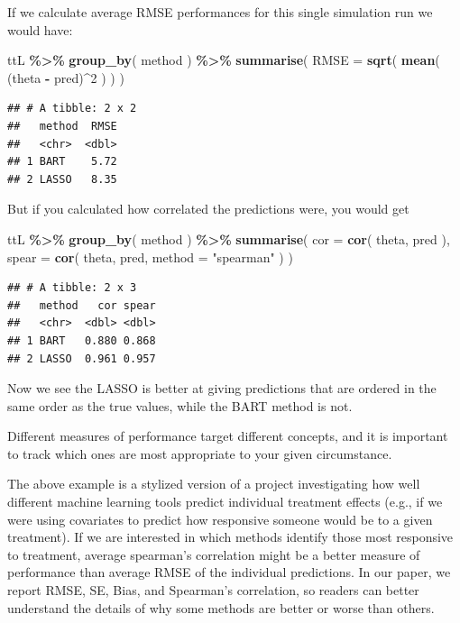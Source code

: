 \documentclass[
]{book}
\newenvironment{Shaded}{\begin{snugshade}}{\end{snugshade}}
\newcommand{\AttributeTok}[1]{\textcolor[rgb]{0.13,0.29,0.53}{#1}}
\newcommand{\DecValTok}[1]{\textcolor[rgb]{0.00,0.00,0.81}{#1}}
\newcommand{\FunctionTok}[1]{\textcolor[rgb]{0.13,0.29,0.53}{\textbf{#1}}}
\newcommand{\NormalTok}[1]{#1}
\newcommand{\SpecialCharTok}[1]{\textcolor[rgb]{0.81,0.36,0.00}{\textbf{#1}}}
\newcommand{\StringTok}[1]{\textcolor[rgb]{0.31,0.60,0.02}{#1}}
\begin{document}
If we calculate average RMSE performances for this single simulation run we would have:

\begin{Shaded}
\begin{Highlighting}[]
\NormalTok{ttL }\SpecialCharTok{\%\textgreater{}\%}
  \FunctionTok{group\_by}\NormalTok{( method ) }\SpecialCharTok{\%\textgreater{}\%}
  \FunctionTok{summarise}\NormalTok{( }\AttributeTok{RMSE =} \FunctionTok{sqrt}\NormalTok{( }\FunctionTok{mean}\NormalTok{( (theta }\SpecialCharTok{{-}}\NormalTok{ pred)}\SpecialCharTok{\^{}}\DecValTok{2}\NormalTok{ ) ) )}
\end{Highlighting}
\end{Shaded}

\begin{verbatim}
## # A tibble: 2 x 2
##   method  RMSE
##   <chr>  <dbl>
## 1 BART    5.72
## 2 LASSO   8.35
\end{verbatim}

But if you calculated how correlated the predictions were, you would get

\begin{Shaded}
\begin{Highlighting}[]
\NormalTok{ttL }\SpecialCharTok{\%\textgreater{}\%}
  \FunctionTok{group\_by}\NormalTok{( method ) }\SpecialCharTok{\%\textgreater{}\%}
  \FunctionTok{summarise}\NormalTok{( }\AttributeTok{cor =} \FunctionTok{cor}\NormalTok{( theta, pred ),}
             \AttributeTok{spear =} \FunctionTok{cor}\NormalTok{( theta, pred, }\AttributeTok{method =} \StringTok{"spearman"}\NormalTok{ ) )}
\end{Highlighting}
\end{Shaded}

\begin{verbatim}
## # A tibble: 2 x 3
##   method   cor spear
##   <chr>  <dbl> <dbl>
## 1 BART   0.880 0.868
## 2 LASSO  0.961 0.957
\end{verbatim}

Now we see the LASSO is better at giving predictions that are ordered in the same order as the true values, while the BART method is not.

Different measures of performance target different concepts, and it is important to track which ones are most appropriate to your given circumstance.

The above example is a stylized version of a project investigating how well different machine learning tools predict individual treatment effects (e.g., if we were using covariates to predict how responsive someone would be to a given treatment).
If we are interested in which methods identify those most responsive to treatment, average spearman's correlation might be a better measure of performance than average RMSE of the individual predictions.
In our paper, we report RMSE, SE, Bias, and Spearman's correlation, so readers can better understand the details of why some methods are better or worse than others.
\end{document}
